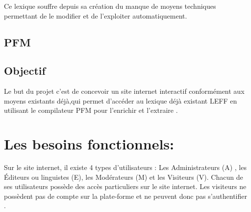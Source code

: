 \documentclass[12pt,a4paper]{article}
\begin{document}
\smallbreak Ce lexique souffre depuis sa création du manque de moyens techniques permettant de le modifier et de l'exploiter automatiquement.


 \subsection*{\textbf{PFM}}


\subsection{Objectif}
\smallbreak 
Le but du projet c'est de concevoir un site internet interactif conformément aux moyens existants déjà,qui permet d'accéder au lexique déjà existant LEFF en utilisant le compilateur PFM  pour l'enrichir et l'extraire .



\section{Les besoins fonctionnels:}

Sur le site internet, il existe 4 types d’utilisateurs : Les Administrateurs (A) , les Éditeurs ou linguistes (E), les Modérateurs (M) et les Visiteurs (V).
Chacun de ses utilisateurs possède des accès particuliers sur le site internet.
Les visiteurs ne possèdent pas de compte sur la plate-forme et ne peuvent donc pas s'authentifier . 
\end{document}
